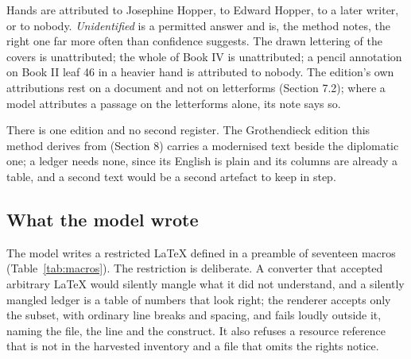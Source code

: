 \documentclass[11pt]{article}
\begin{document}
Hands are attributed to Josephine Hopper, to Edward Hopper, to a later writer, or to nobody. \emph{Unidentified} is a permitted answer and is, the method notes, the right one far more often than confidence suggests. The drawn lettering of the covers is unattributed; the whole of Book IV is unattributed; a pencil annotation on Book II leaf 46 in a heavier hand is attributed to nobody. The edition's own attributions rest on a document and not on letterforms (Section 7.2); where a model attributes a passage on the letterforms alone, its note says so.

There is one edition and no second register. The Grothendieck edition this method derives from (Section 8) carries a modernised text beside the diplomatic one; a ledger needs none, since its English is plain and its columns are already a table, and a second text would be a second artefact to keep in step.

\subsection{What the model wrote}

The model writes a restricted LaTeX defined in a preamble of seventeen macros (Table~\ref{tab:macros}). The restriction is deliberate. A converter that accepted arbitrary LaTeX would silently mangle what it did not understand, and a silently mangled ledger is a table of numbers that look right; the renderer accepts only the subset, with ordinary line breaks and spacing, and fails loudly outside it, naming the file, the line and the construct. It also refuses a resource reference that is not in the harvested inventory and a file that omits the rights notice.
\end{document}
